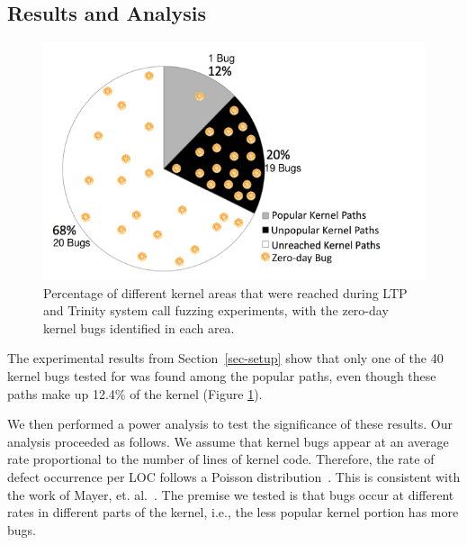 \subsection{Results and Analysis}
\label{Verification-of-Hypothesis}
\begin{figure}
\centering
\includegraphics[width=1.0\columnwidth]{diagram/popular_paths.png}
\caption{\small Percentage of different kernel areas that were reached during
 LTP and Trinity system call fuzzing experiments, with the zero-day kernel bugs identified
 in each area.}
\label{fig:coverage}
\end{figure}

The experimental results from Section~\ref{sec-setup} show that only one of the 40 kernel bugs
tested for was found among the popular paths, even though these paths make up 12.4\% of the kernel
(Figure \ref{fig:coverage}).

We then performed a power analysis to test the significance of these results.
%
Our analysis proceeded as follows. We assume that kernel bugs appear at an average rate proportional to the
number of lines of kernel code.
Therefore, the rate of defect occurrence per LOC
follows a Poisson distribution~\cite{Poisson-distribution}.
This is consistent with the work of Mayer, et. al.~\cite{mayer1989probability}.
The premise we tested is that bugs occur at different rates in different
parts of the kernel, i.e., the less popular kernel portion has more bugs.

